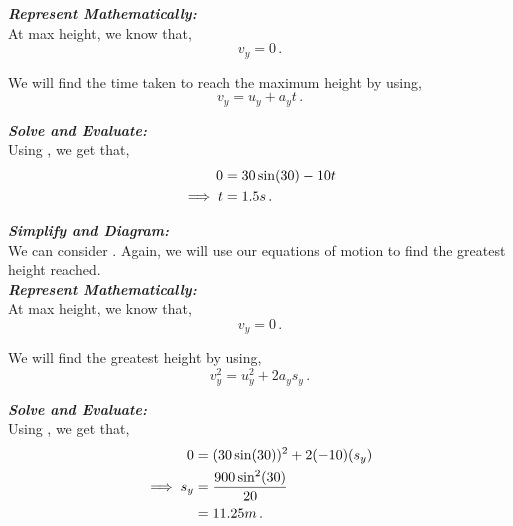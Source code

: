 \begin{subquestions}
	
	
	
\textbf{\textit{Represent Mathematically:}} \\
At max height, we know that,
\begin{equation}
	v_y = 0 \,.
\end{equation}

We will find the time taken to reach the maximum height by using,
\begin{equation}
	v_y = u_y + a_yt \label{2005:q5:VEqn1} \,.
\end{equation}	
	



\textbf{\textit{Solve and Evaluate:}} \\ 
Using , we get that,
\begin{align}
	0 & = 30\sin(30) -10t \nonumber \\
	\implies t & = 1.5s \,. 
\end{align}


\subquestion 

\textbf{\textit{Simplify and Diagram:}} \\ 
We can consider . Again, we will use our equations of motion to find the greatest height reached. \\




\textbf{\textit{Represent Mathematically:}} \\ 
At max height, we know that,
\begin{equation}
	v_y = 0 \,.
\end{equation}

We will find the greatest height by using,
\begin{equation}
	v_y^2 = u_y^2 + 2a_ys_y \label{2005:q5:SEqn1} \,.
\end{equation}




\textbf{\textit{Solve and Evaluate:}} \\ 
Using , we get that,
\begin{align}
	0 & = (30\sin(30))^2 + 2(-10)(s_y) \nonumber \\
	\implies s_y & = \frac{900\sin^2(30)}{20} \nonumber \\
	             & = 11.25m \,.	
\end{align}


\end{subquestions}
